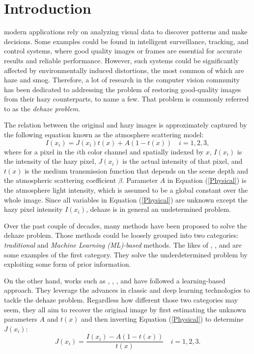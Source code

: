 \documentclass[journal]{IEEEtran}
\begin{document}
\section{Introduction}

 modern applications rely on analyzing visual data to discover patterns and make decisions. Some examples could be found in intelligent surveillance, tracking, and control systems, where good quality images or frames are essential for accurate results and reliable performance. However, such systems could be significantly affected by environmentally induced distortions, the most common of which are haze and smog. Therefore, a lot of research in the computer vision community has been dedicated to addressing the problem of restoring good-quality images from their hazy counterparts, \cite{ColorAtten,DehazeNet,DarkChanPrior,berman2016non} to name a few. That problem is commonly referred to as the \textit{dehaze problem}.

The relation between the original and hazy images  \cite{narasimhan2002vision} is approximately captured by the following equation known as the atmosphere scattering model:
\begin{equation}\label{Physical}
I(x_{i})=J(x_{i})t(x)+A(1-t(x))\quad i=1,2,3 ,
\end{equation}
where for a pixel in the $i$th color channel and spatially indexed by $x$, $I(x_{i})$ is the intensity of the hazy pixel, $J(x_{i})$ is the actual intensity of that pixel, and $t(x)$ is the medium transmission function that depends on the scene depth and the atmospheric scattering coefficient $\beta$. Parameter $A$ in Equation (\ref{Physical}) is the atmosphere light intensity, which is assumed to be a global constant over the whole image. Since all variables in Equation (\ref{Physical}) are unknown except the hazy pixel intensity $I(x_{i})$, dehaze is in general an undetermined problem.

Over the past couple of decades, many methods have been proposed to solve the dehaze problem. Those methods could be loosely grouped into two categories: \textit{traditional} and \textit{Machine Learning (ML)-based} methods. The likes of \cite{DarkChanPrior}, \cite{ColorAtten}, and \cite{MarkovRandField} are some examples of the first category. They solve the underdetermined problem by exploiting some form of  prior information. 



On the other hand, works such as \cite{RandForstReg}, \cite{DehazeNet}, \cite{MultiScaleCNN}, and \cite{AllInOne} have followed a learning-based approach. They leverage the advances in classic and deep learning technologies to tackle the dehaze problem. Regardless how different those two categories may seem, they all aim to recover the original image by first estimating the unknown parameters $A$ and $t(x)$ and then inverting Equation (\ref{Physical}) to determine $J(x_{i})$:
\begin{equation}
J(x_{i})=\frac{I(x_{i})-A(1-t(x))}{t(x)}\quad i=1,2,3.
\end{equation}
\end{document}
